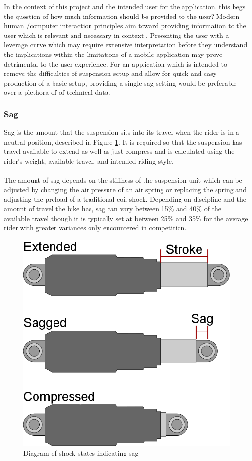 		In the context of this project and the intended user for the application, this begs the question of how much information should be provided to the user? Modern human /computer interaction principles aim toward providing information to the user which is relevant and necessary in context \citep{shneiderman2010designing}. Presenting the user with a leverage curve which may require extensive interpretation before they understand the implications within the limitations of a mobile application may prove detrimental to the user experience. For an application which is intended to remove the difficulties of suspension setup and allow for quick and easy production of a basic setup, providing a single sag setting would be preferable over a plethora of of technical data.	
	\subsubsection{Sag} \label{sec:sag}
		Sag is the amount that the suspension sits into its travel when the rider is in a neutral position, described in Figure \ref{fig:sag}. It is required so that the suspension has travel available to extend as well as just compress and is calculated using the rider’s weight, available travel, and intended riding style.
		\\\\
		The amount of sag depends on the stiffness of the suspension unit which can be adjusted by changing the air pressure of an air spring or replacing the spring and adjusting the preload of a traditional coil shock. Depending on discipline and the	amount of travel the bike has, sag can vary between 15\% and 40\% of the available travel though it is typically set at between 25\% and 35\% for the average rider with greater variances only encountered in competition.
		\begin{figure}[h!]
			\centering
			\includegraphics[scale=0.5]{../images/sag_diagram.png}
			\caption{Diagram of shock states indicating sag}
			\label{fig:sag}
		\end{figure}
